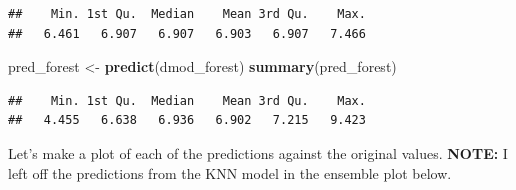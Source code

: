 \documentclass[]{article}
\newenvironment{Shaded}{\begin{snugshade}}{\end{snugshade}}
\newcommand{\KeywordTok}[1]{\textcolor[rgb]{0.13,0.29,0.53}{\textbf{{#1}}}}
\newcommand{\StringTok}[1]{\textcolor[rgb]{0.31,0.60,0.02}{{#1}}}
\newcommand{\NormalTok}[1]{{#1}}
\begin{document}
\begin{verbatim}
##    Min. 1st Qu.  Median    Mean 3rd Qu.    Max. 
##   6.461   6.907   6.907   6.903   6.907   7.466
\end{verbatim}

\begin{Shaded}
\begin{Highlighting}[]
\NormalTok{pred_forest <-}\StringTok{ }\KeywordTok{predict}\NormalTok{(dmod_forest)}
\KeywordTok{summary}\NormalTok{(pred_forest)}
\end{Highlighting}
\end{Shaded}

\begin{verbatim}
##    Min. 1st Qu.  Median    Mean 3rd Qu.    Max. 
##   4.455   6.638   6.936   6.902   7.215   9.423
\end{verbatim}

Let's make a plot of each of the predictions against the original
values. \textbf{NOTE:} I left off the predictions from the KNN model in
the ensemble plot below.
\end{document}

